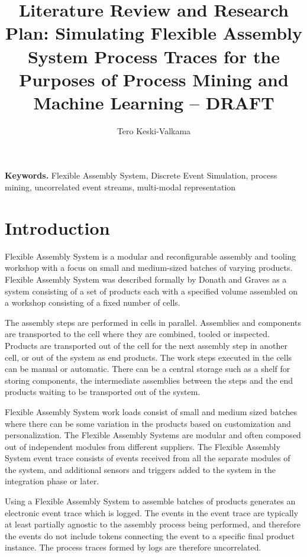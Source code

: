 \documentclass[a4paper,10pt]{article}
\title{Literature Review and Research Plan: Simulating Flexible Assembly System Process Traces for the Purposes of Process Mining and Machine Learning – DRAFT}
\author{Tero Keski-Valkama}
\begin{document}
\maketitle

\smallskip
\noindent \textbf{Keywords.} Flexible Assembly System, Discrete Event Simulation, process mining, uncorrelated event streams, multi-modal representation

\tableofcontents

\section{Introduction}
Flexible Assembly System is a modular and reconfigurable assembly and tooling workshop with a focus on small and medium-sized batches of varying products.
Flexible Assembly System was described formally by Donath and Graves \cite{donath1988flexible} as a system consisting of a set of products each with a specified volume
assembled on a workshop consisting of a fixed number of cells.

The assembly steps are performed in cells in parallel. Assemblies and components are transported to the cell where they are combined, tooled or inspected. Products
are transported out of the cell for the next assembly step in another cell, or out of the system as end products.
The work steps executed in the cells can be manual or automatic. There can be a central storage such as a shelf for storing components, the intermediate assemblies between the steps
and the end products waiting to be transported out of the system.

Flexible Assembly System work loads consist of small and medium sized batches where there can be some variation in the products based on customization and personalization.
The Flexible Assembly Systems are modular and often composed out of independent modules from different suppliers. The Flexible Assembly System event trace consists
of events received from all the separate modules of the system, and additional sensors and triggers added to the system in the integration phase or later.

Using a Flexible Assembly System to assemble batches of products generates an electronic event trace which is logged. The events in the event trace are typically at least
partially agnostic to the assembly process being performed, and therefore the events do not include tokens connecting the event to a specific final product instance.
The process traces formed by logs are therefore uncorrelated.
\end{document}
